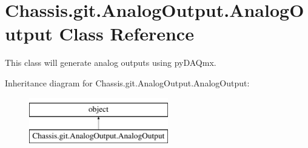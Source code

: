 \hypertarget{class_chassis_8git_1_1_analog_output_1_1_analog_output}{\section{Chassis.\-git.\-Analog\-Output.\-Analog\-Output Class Reference}
\label{class_chassis_8git_1_1_analog_output_1_1_analog_output}
}


This class will generate analog outputs using py\-D\-A\-Qmx.  


Inheritance diagram for Chassis.\-git.\-Analog\-Output.\-Analog\-Output\-:\begin{figure}[H]
\begin{center}
\leavevmode
\includegraphics[height=2.000000cm]{class_chassis_8git_1_1_analog_output_1_1_analog_output}
\end{center}
\end{figure}
